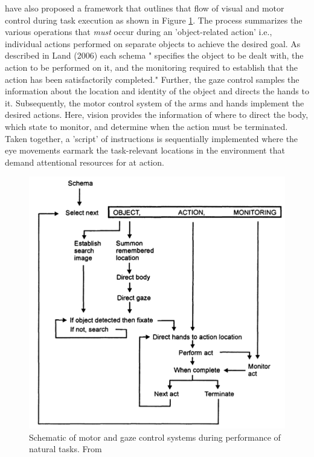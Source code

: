 \citet{Land2001-do} have also proposed a framework that outlines that flow of visual and motor control during task execution as shown in Figure \ref{fig:land_schema}. The process summarizes the various operations that \emph{must} occur during an 'object-related action' i.e., individual actions performed on separate objects to achieve the desired goal. As described in Land (2006) each schema " specifies the object to be dealt with, the action to be performed on it, and the monitoring required to establish that the action has been satisfactorily completed." Further, the gaze control samples the information about the location and identity of the object and directs the hands to it. Subsequently, the motor control system of the arms and hands implement the desired actions. Here, vision provides the information of where to direct the body, which state to monitor, and determine when the action must be terminated. Taken together, a 'script' of instructions is sequentially implemented where the eye movements earmark the task-relevant locations in the environment that demand attentional resources for at action.

\begin{figure}[h]
    \centering
    \includegraphics[width=0.6\linewidth]{source/figures/introduction/land_schema.PNG}
    \caption{Schematic of motor and gaze control systems during performance of natural tasks. From \citet{Land2001-do}}
    \label{fig:land_schema}
\end{figure}

